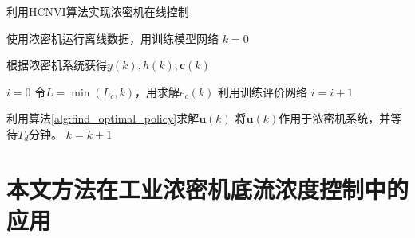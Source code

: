 \begin{algorithm}[!ht]

\caption{利用HCNVI算法实现浓密机在线控制} %
\label{alg:HCNVI}

\begin{algorithmic}[1]


\State
使用浓密机运行离线数据，用训练模型网络
\State $k=0$ 

\State 根据浓密机系统获得$y(k), h(k),\pmb c(k)$

 \State $i=0$ \Do
    \State 令$L=\min(L_c, k)$，用求解$e_c(k)$
    \State 利用训练评价网络
    \State $i=i+1$



\EndIf

\State 利用算法\ref{alg:find_optimal_policy}求解${\pmb u}(k)$ \State
将${\pmb u}(k)$作用于浓密机系统，并等待$T_d$分钟。 \State $k=k+1$

\EndWhile
\end{algorithmic}

\end{algorithm}

\section{本文方法在工业浓密机底流浓度控制中的应用}
